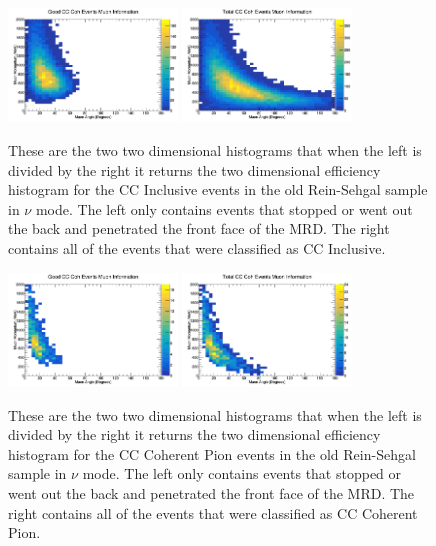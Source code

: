\documentclass[11pt]{article}
\begin{document}
\begin{figure}[H]
\centering
\includegraphics[width=0.4\textwidth]{OldNMReinSehgalImages/6-GoodCCCohMuonInfoNMORS.png}
\includegraphics[width=0.4\textwidth]{OldNMReinSehgalImages/9-TotalCCCohMuonInfoNMORS.png}
\caption{These are the two two dimensional histograms that when the left is divided by the right it returns the two dimensional efficiency histogram for the CC Inclusive events in the old Rein-Sehgal sample in $\nu$ mode. The left only contains events that stopped or went out the back and penetrated the front face of the MRD. The right contains all of the events that were classified as CC Inclusive.}
\end{figure}

\begin{figure}[H]
\centering
\includegraphics[width=0.4\textwidth]{OldNMReinSehgalImages/7.png}
\includegraphics[width=0.4\textwidth]{OldNMReinSehgalImages/8.png}
\caption{These are the two two dimensional histograms that when the left is divided by the right it returns the two dimensional efficiency histogram for the CC Coherent Pion events in the old Rein-Sehgal sample in $\nu$ mode. The left only contains events that stopped or went out the back and penetrated the front face of the MRD. The right contains all of the events that were classified as CC Coherent Pion.}
\end{figure}
\end{document}
